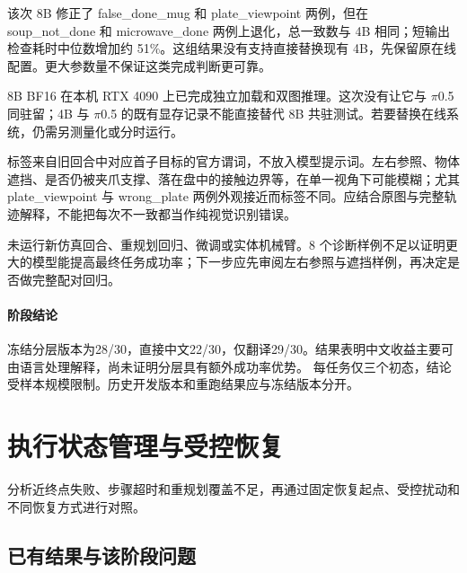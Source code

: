 该次 8B 修正了 false\_done\_mug 和 plate\_viewpoint 两例，但在 soup\_not\_done 和 microwave\_done 两例上退化，总一致数与 4B 相同；短输出检查耗时中位数增加约 51\%。这组结果没有支持直接替换现有 4B，先保留原在线配置。更大参数量不保证这类完成判断更可靠。

8B BF16 在本机 RTX 4090 上已完成独立加载和双图推理。这次没有让它与 \(\pi\)0.5 同驻留；4B 与 \(\pi\)0.5 的既有显存记录不能直接替代 8B 共驻测试。若要替换在线系统，仍需另测量化或分时运行。

标签来自旧回合中对应首子目标的官方谓词，不放入模型提示词。左右参照、物体遮挡、是否仍被夹爪支撑、落在盘中的接触边界等，在单一视角下可能模糊；尤其 plate\_viewpoint 与 wrong\_plate 两例外观接近而标签不同。应结合原图与完整轨迹解释，不能把每次不一致都当作纯视觉识别错误。

未运行新仿真回合、重规划回归、微调或实体机械臂。8 个诊断样例不足以证明更大的模型能提高最终任务成功率；下一步应先审阅左右参照与遮挡样例，再决定是否做完整配对回归。



\paragraph{阶段结论}冻结分层版本为28/30，直接中文22/30，仅翻译29/30。结果表明中文收益主要可由语言处理解释，尚未证明分层具有额外成功率优势。 每任务仅三个初态，结论受样本规模限制。历史开发版本和重跑结果应与冻结版本分开。



\FloatBarrier

\section{执行状态管理与受控恢复}

\label{stage:s10}

分析近终点失败、步骤超时和重规划覆盖不足，再通过固定恢复起点、受控扰动和不同恢复方式进行对照。

\subsection{已有结果与该阶段问题}\label{s10-detail-1}

